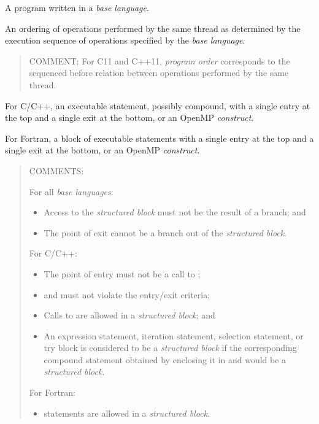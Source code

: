 \glossarydefstart
A program written in a \emph{base language}.
\glossarydefend

\glossarydefstart
An ordering of operations performed by the same thread as determined by the
execution sequence of operations specified by the \emph{base language}.

\begin{quote}
COMMENT: For C11 and C++11, \emph{program order} corresponds to the sequenced
before relation between operations performed by the same thread.
\end{quote}
\glossarydefend

\glossarydefstart
For C/C++, an executable statement, possibly compound, with a single entry at the 
top and a single exit at the bottom, or an OpenMP \emph{construct}.

For Fortran, a block of executable statements with a single entry at the top and a 
single exit at the bottom, or an OpenMP \emph{construct}.

\begin{quote}
COMMENTS:

For all \emph{base languages}:

\begin{itemize}
\item Access to the \emph{structured block} must not be the result of a branch; and

\item The point of exit cannot be a branch out of the \emph{structured block}.
\end{itemize}

For C/C++:

\begin{itemize}
\item The point of entry must not be a call to ;

\item {} and  must not violate the entry/exit criteria;

\item Calls to  are allowed in a \emph{structured block}; and

\item An expression statement, iteration statement, selection statement, 
or try block is considered to be a \emph{structured block} if the 
corresponding compound statement obtained by enclosing it in \code{\{} 
and \code{\}} would be a \emph{structured block}.
\end{itemize}

For Fortran:

\begin{itemize}
\item {} statements are allowed in a \emph{structured block}.
\end{itemize}
\end{quote}
\glossarydefend



